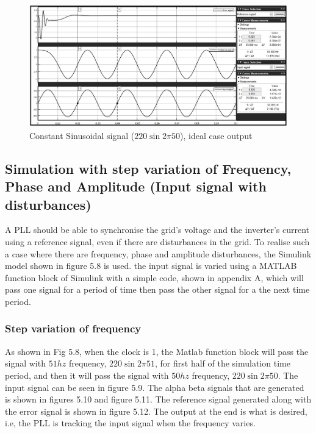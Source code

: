 \documentclass[a4paper,12pt]{iitmdiss}
\begin{document}
 \begin{figure}[hbt!]
    \centering
    \includegraphics[width=1.0\textwidth]{output_one signal.jpg}
    \caption{Constant Sinusoidal signal ($220\sin{2 \pi 50}$), ideal case output}
\end{figure}

\subsection{Simulation with step variation of Frequency, Phase and Amplitude (Input signal with disturbances)}

A PLL should be able to synchronise the grid's voltage and the inverter's current using a reference signal, even if there are disturbances in the grid. To realise such a case where there are frequency, phase and amplitude disturbances, the Simulink model shown in figure 5.8 is used. the input signal is varied using a MATLAB function block of Simulink with a simple code, shown in appendix A, which will pass one signal for a period of time then pass the other signal for a the next time period.

\subsubsection{Step variation of frequency}

As shown in Fig 5.8, when the clock is 1, the Matlab function block will pass the signal with $51hz$  frequency, $220\sin{2\pi51}$, for first half of the simulation time period, and then it will pass the signal with $50hz$ frequency, $220\sin{2\pi50}$. The input signal can be seen in figure 5.9. The alpha beta signals that are generated is shown in figures 5.10 and figure 5.11. The reference signal generated along with the error signal is shown in figure 5.12. The output at the end is what is desired, i.e, the PLL is tracking the input signal when the frequency varies.
\end{document}
